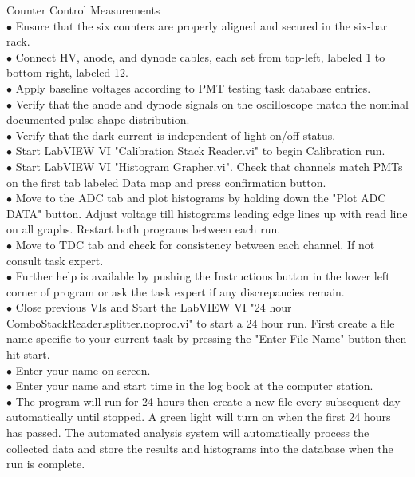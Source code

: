 Counter Control Measurements\\

$\bullet$ Ensure that the six counters are properly aligned and secured in the six-bar rack.\\
$\bullet$ Connect HV, anode, and dynode cables, each set from top-left, labeled 1 to
bottom-right, labeled 12.\\
$\bullet$ Apply baseline voltages according to PMT testing task database entries.\\
$\bullet$ Verify that the anode and dynode signals on the oscilloscope match the nominal
documented pulse-shape distribution.\\
$\bullet$ Verify that the dark current is independent of light on/off status.\\
$\bullet$ Start LabVIEW VI "Calibration Stack Reader.vi" to begin Calibration run.\\
$\bullet$ Start LabVIEW VI "Histogram Grapher.vi". Check that channels match PMTs
on the first tab labeled Data map and press confirmation button.\\
$\bullet$ Move to the ADC tab and plot histograms by holding down the "Plot ADC
DATA" button. Adjust voltage till histograms leading edge lines up with read
line on all graphs. Restart both programs between each run.\\
$\bullet$ Move to TDC tab and check for consistency between each channel. If not
consult task expert.\\
$\bullet$ Further help is available by pushing the Instructions button in the lower left
corner of program or ask the task expert if any discrepancies remain.\\
$\bullet$ Close previous VIs and Start the LabVIEW VI "24 hour
ComboStackReader.splitter.noproc.vi" to start a 24 hour run. First create a file
name specific to your current task by pressing the "Enter File Name" button
then hit start.\\
$\bullet$ Enter your name on screen.\\
$\bullet$ Enter your name and start time in the log book at the computer station.\\
$\bullet$ The program will run for 24 hours then create a new file every subsequent day
automatically until stopped. A green light will turn on when the first 24 hours
has passed. The automated analysis system will automatically process the
collected data and store the results and histograms into the database when the
run is complete.\\

